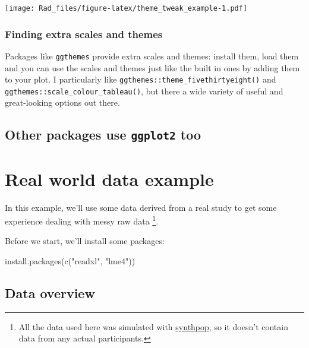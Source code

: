 \documentclass[
]{book}
\newenvironment{Shaded}{\begin{snugshade}}{\end{snugshade}}
\newcommand{\FunctionTok}[1]{\textcolor[rgb]{0.00,0.00,0.00}{#1}}
\newcommand{\NormalTok}[1]{#1}
\newcommand{\StringTok}[1]{\textcolor[rgb]{0.31,0.60,0.02}{#1}}
\begin{document}
\texttt{[image: Rad\_files/figure-latex/theme\_tweak\_example-1.pdf]}

\hypertarget{finding-extra-scales-and-themes}{%
\subsection{Finding extra scales and themes}\label{finding-extra-scales-and-themes}}

Packages like \texttt{ggthemes} provide extra scales and themes: install
them, load them and you can use the scales and themes just like
the built in ones by adding them to your plot. I particularly like
\texttt{ggthemes::theme\_fivethirtyeight()}
and \texttt{ggthemes::scale\_colour\_tableau()}, but there a wide variety
of useful and great-looking options out there.

\hypertarget{other-packages-use-ggplot2-too}{%
\section{\texorpdfstring{Other packages use \texttt{ggplot2} too}{Other packages use ggplot2 too}}\label{other-packages-use-ggplot2-too}}

\hypertarget{real-world-data-example}{%
\chapter{Real world data example}\label{real-world-data-example}}

In this example, we'll use some data derived from a real study to get
some experience dealing with messy raw data \footnote{All the data used here was simulated with
  \href{https://cran.r-project.org/web/packages/synthpop/index.html}{synthpop},
  so it doesn't contain data from any actual participants.}.

Before we start, we'll install some packages:

\begin{Shaded}
\begin{Highlighting}[]
\FunctionTok{install.packages}\NormalTok{(}\FunctionTok{c}\NormalTok{(}\StringTok{"readxl"}\NormalTok{, }\StringTok{"lme4"}\NormalTok{))}
\end{Highlighting}
\end{Shaded}

\hypertarget{data-overview}{%
\section{Data overview}\label{data-overview}}
\end{document}
